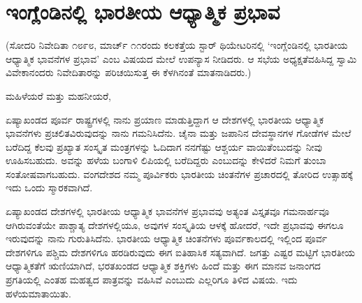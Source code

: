 
\chapter{ಇಂಗ್ಲೆಂಡಿನಲ್ಲಿ ಭಾರತೀಯ ಆಧ್ಯಾತ್ಮಿಕ ಪ್ರಭಾವ}

(ಸೋದರಿ ನಿವೇದಿತಾ ೧೮೯೮, ಮಾರ್ಚ್​ ೧೧ರಂದು ಕಲಕತ್ತೆಯ ಸ್ಟಾರ್​ ಥಿಯೇಟರಿನಲ್ಲಿ ‘ಇಂಗ್ಲೆಂಡಿನಲ್ಲಿ ಭಾರತೀಯ ಆಧ್ಯಾತ್ಮಿಕ ಭಾವನೆಗಳ ಪ್ರಭಾವ’ ಎಂಬ ವಿಷಯದ ಮೇಲೆ ಉಪನ್ಯಾಸ ನೀಡಿದರು. ಆ ಸಭೆಯ ಅಧ್ಯಕ್ಷತೆ\break ವಹಿಸಿದ್ದ ಸ್ವಾಮಿ ವಿವೇಕಾನಂದರು ನಿವೇದಿತಾರನ್ನು ಪರಿಚಯಿಸುತ್ತ ಈ ಕೆಳಗಿನಂತೆ ಮಾತನಾಡಿದರು.)

ಮಹಿಳೆಯರೆ ಮತ್ತು ಮಹನೀಯರೆ,

ಏಷ್ಯಾಖಂಡದ ಪೂರ್ವ ರಾಷ್ಟ್ರಗಳಲ್ಲಿ ನಾನು ಪ್ರಯಾಣ ಮಾಡುತ್ತಿದ್ದಾಗ ಆ ದೇಶಗಳಲ್ಲಿ ಭಾರತೀಯ ಆಧ್ಯಾತ್ಮಿಕ ಭಾವನೆಗಳು ಪ್ರಚಲಿತವಿರುವುದನ್ನು ನಾನು ಗಮನಿಸಿದೆನು. ಚೈನಾ ಮತ್ತು ಜಪಾನಿನ ದೇವಸ್ಥಾನಗಳ ಗೋಡೆಗಳ ಮೇಲೆ ಬರೆದಿದ್ದ ಕೆಲವು ಪ್ರಖ್ಯಾತ ಸಂಸ್ಕೃತ ಮಂತ್ರಗಳನ್ನು ಓದಿದಾಗ ನನಗೆಷ್ಟು ಆಶ್ಚರ್ಯ ವಾಯಿತೆಂಬುದನ್ನು ನೀವು ಊಹಿಸಬಹುದು. ಅವನ್ನು ಹಳೆಯ ಬಂಗಾಳಿ ಲಿಪಿಯಲ್ಲಿ ಬರೆದಿದ್ದರು ಎಂಬುದನ್ನು ಕೇಳಿದರೆ ನಿಮಗೆ ತುಂಬಾ ಸಂತೋಷವಾಗಬಹುದು. ವಂಗದೇಶದ ನಮ್ಮ ಪೂರ್ವಿಕರು ಭಾರತೀಯ ಚಿಂತನೆಗಳ ಪ್ರಚಾರದಲ್ಲಿ ತೋರಿದ ಉತ್ಸಾಹಕ್ಕೆ ಇದು ಒಂದು ಸ್ಮಾರಕವಾಗಿದೆ.

ಏಷ್ಯಾಖಂಡದ ದೇಶಗಳಲ್ಲಿ ಭಾರತೀಯ ಆಧ್ಯಾತ್ಮಿಕ ಭಾವನೆಗಳ ಪ್ರಭಾವವು ಅತ್ಯಂತ ವಿಸ್ತೃತವೂ ಗಮನಾರ್ಹವೂ ಆಗಿರುವಂತೆಯೇ ಪಾಶ್ಚಾತ್ಯ ದೇಶಗಳಲ್ಲಿಯೂ, ಅವುಗಳ ಸಂಸ್ಕೃತಿಯ ಆಳಕ್ಕೆ ಹೋದರೆ, ಇದೇ ಪ್ರಭಾವವು ಈಗಲೂ ಇರುವುದನ್ನು ನಾನು ಗುರುತಿಸಿದೆನು. ಭಾರತೀಯ ಆಧ್ಯಾತ್ಮಿಕ ಚಿಂತನೆಗಳು ಪೂರ್ವಕಾಲದಲ್ಲಿ ಇಲ್ಲಿಂದ ಪೂರ್ವ ದೇಶಗಳಿಗೂ ಪಶ್ಚಿಮ ದೇಶಗಳಿಗೂ ಹರಡಿರು\-ವುದು ಈಗ ಐತಿಹಾಸಿಕ ಸತ್ಯವಾಗಿದೆ. ಜಗತ್ತು ಎಷ್ಟರ ಮಟ್ಟಿಗೆ ಭಾರತೀಯ ಆಧ್ಯಾತ್ಮಿಕತೆಗೆ ಋಣಿಯಾಗಿದೆ, ಭರತಖಂಡದ ಆಧ್ಯಾತ್ಮಿಕ ಶಕ್ತಿಗಳು ಹಿಂದೆ ಮತ್ತು ಈಗ ಮಾನವ ಜನಾಂಗದ ಪ್ರಗತಿಯಲ್ಲಿ ಎಂತಹ ಮಹತ್ವದ ಪಾತ್ರವನ್ನು ವಹಿಸಿವೆ ಎಂಬುದು ಎಲ್ಲರಿಗೂ ತಿಳಿದ ವಿಷಯ. ಇದು ಹಳೆಯ\break ಮಾತಾಯಿತು.

\newpage

